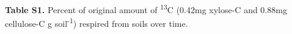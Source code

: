 \textbf{Table S1.} Percent of original amount of \textsuperscript{13}C (0.42mg xylose-C and 0.88mg cellulose-C g soil\textsuperscript{-1}) respired from soils over time. 